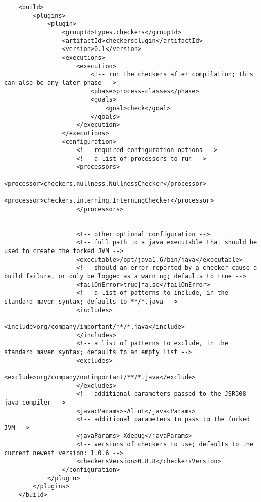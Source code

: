 \begin{enumerate}
\begin{Verbatim}
    <build>  
        <plugins>  
            <plugin>  
                <groupId>types.checkers</groupId>  
                <artifactId>checkersplugin</artifactId>  
                <version>0.1</version>  
                <executions>  
                    <execution>  
                        <!-- run the checkers after compilation; this can also be any later phase -->  
                        <phase>process-classes</phase>  
                        <goals>  
                            <goal>check</goal>  
                        </goals>  
                    </execution>  
                </executions>  
                <configuration>  
                    <!-- required configuration options -->  
                    <!-- a list of processors to run -->  
                    <processors>  
                        <processor>checkers.nullness.NullnessChecker</processor>  
                        <processor>checkers.interning.InterningChecker</processor>  
                    </processors>  


                    <!-- other optional configuration -->  
                    <!-- full path to a java executable that should be used to create the forked JVM -->  
                    <executable>/opt/java1.6/bin/java</executable>  
                    <!-- should an error reported by a checker cause a build failure, or only be logged as a warning; defaults to true -->  
                    <failOnError>true|false</failOnError>  
                    <!-- a list of patterns to include, in the standard maven syntax; defaults to **/*.java -->  
                    <includes>  
                        <include>org/company/important/**/*.java</include>  
                    </includes>  
                    <!-- a list of patterns to exclude, in the standard maven syntax; defaults to an empty list -->  
                    <excludes>  
                        <exclude>org/company/notimportant/**/*.java</exclude>  
                    </excludes>  
                    <!-- additional parameters passed to the JSR308 java compiler -->  
                    <javacParams>-Alint</javacParams>  
                    <!-- additional parameters to pass to the forked JVM -->  
                    <javaParams>-Xdebug</javaParams>  
                    <!-- versions of checkers to use; defaults to the current newest version: 1.0.6 -->  
                    <checkersVersion>0.8.8</checkersVersion>    
                </configuration>  
            </plugin>  
        </plugins>  
    </build>
\end{Verbatim}

\end{enumerate}

